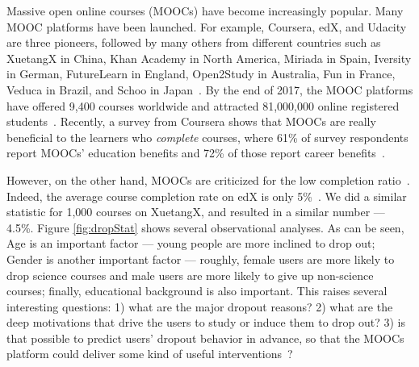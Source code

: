 Massive open online courses (MOOCs) have become increasingly
popular.
Many MOOC platforms have been launched. For example, Coursera, edX, and Udacity are three pioneers, followed by many others from different countries such as 
XuetangX in China, Khan Academy in North America, Miriada in
Spain, Iversity in German, FutureLearn in England, Open2Study
in Australia, Fun in France, Veduca in Brazil, and Schoo in Japan~\cite{Qiu:2016:MPL:2835776.2835842}.
By the end of 2017, the MOOC platforms have offered 9,400 courses worldwide and attracted 81,000,000 online registered students~\cite{shah2018product}. 
Recently, a survey from Coursera shows that MOOCs are really beneficial to the learners who \textit{complete} courses, where 61\% of survey respondents report MOOCs' education benefits and 72\% of those report career benefits~\cite{zhenghao2015s}. 

However, on the other hand, MOOCs are criticized for the low completion ratio~\cite{He:2015:IAS:2886521.2886563}. 
Indeed, the average course completion rate on edX is only 5\%~\cite{Kizilcec:2013:DDA:2460296.2460330,Seaton2014Who}.
We did a similar statistic for 1,000 courses on XuetangX, and resulted in a similar number --- 4.5\%.
Figure \ref{fig:dropStat} shows several observational analyses. As can be seen, Age is an important factor --- young people are more inclined to drop out; Gender is another important factor --- roughly, female users are more likely to drop science courses and male users are more likely to give up non-science courses; finally, educational background is also important. 
This raises several interesting questions: 1) what are the major dropout reasons? 2) what are the deep motivations that drive the users to study or induce them to drop out?
3) is that possible to  predict users' dropout behavior in advance, so that the MOOCs platform could deliver some kind of useful  interventions~\cite{halawa2014dropout,Qi:18NIPS}?

